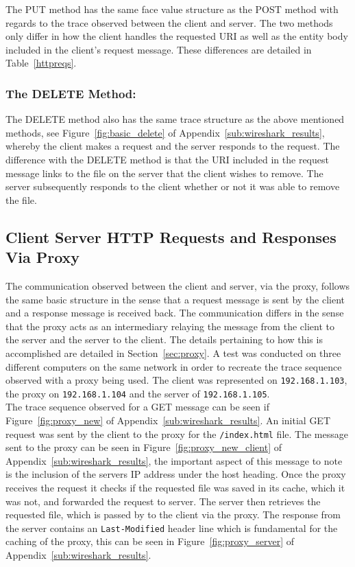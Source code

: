 \documentclass[10pt,twocolumn]{witseiepaper}
\begin{document}
		 The PUT method has the same face value structure as the POST method with regards to the trace observed between the client and server. The two methods only differ in how the client handles the requested URI as well as the entity body included in the client's request message. These differences are detailed in Table~\ref{httpreqs}.
		 
		 \subsubsection*{The DELETE Method:} The DELETE method also has the same trace structure as the above mentioned methods, see Figure~\ref{fig:basic_delete} of Appendix~\ref{sub:wireshark_results}, whereby the client makes a request and the server responds to the request. The difference with the DELETE method is that the URI included in the request message links to the file on the server that the client wishes to remove. The server subsequently responds to the client whether or not it was able to remove the file. 
	 
	 \subsection{Client Server HTTP Requests and Responses Via Proxy}	
	 
		 The communication observed between the client and server, via the proxy, follows the same basic structure in the sense that a request message is sent by the client and a response message is received back. The communication differs in the sense that the proxy acts as an intermediary relaying the message from the client to the server and the server to the client. The details pertaining to how this is accomplished are detailed in Section~\ref{sec:proxy}. A test was conducted on three different computers on the same network in order to recreate the trace sequence observed with a proxy being used. The client was represented on \texttt{192.168.1.103}, the proxy on \texttt{192.168.1.104} and the server of \texttt{192.168.1.105}. \\
		 
		 The trace sequence observed for a GET message can be seen if Figure~\ref{fig:proxy_new} of Appendix~\ref{sub:wireshark_results}. An initial GET request was sent by the client to the proxy for the \texttt{/index.html} file. The message sent to the proxy can be seen in Figure~\ref{fig:proxy_new_client} of Appendix~\ref{sub:wireshark_results}, the important aspect of this message to note is the inclusion of the servers IP address under the host heading. Once the proxy receives the request it checks if the requested file was saved in its cache, which it was not, and forwarded the request to server. The server then retrieves the requested file, which is passed by to the client via the proxy. The response from the server contains an \texttt{Last-Modified} header line which is fundamental for the caching of the proxy, this can be seen in Figure~\ref{fig:proxy_server} of Appendix~\ref{sub:wireshark_results}. \\
		 
\end{document}
